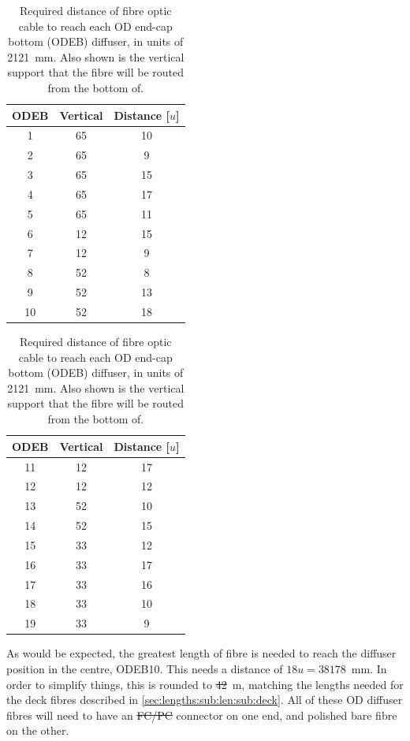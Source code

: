 \documentclass[a4paper,11pt]{article}
\providecommand{\DIFaddtex}[1]{{\protect\color{blue}\uwave{#1}}} %
\providecommand{\DIFdeltex}[1]{{\protect\color{red}\sout{#1}}}                      %
\providecommand{\DIFaddbegin}{} %
\providecommand{\DIFaddend}{} %
\providecommand{\DIFdelbegin}{} %
\providecommand{\DIFdelend}{} %
\providecommand{\DIFadd}[1]{\texorpdfstring{\DIFaddtex{#1}}{#1}} %
\providecommand{\DIFdel}[1]{\texorpdfstring{\DIFdeltex{#1}}{}} %
\newcommand{\DIFscaledelfig}{0.5}
\newlength{\DIFdelgraphicswidth} %
\newlength{\DIFdelgraphicsheight} %
\newcommand{\DIFaddincludegraphics}[2][]{{\color{blue}\fbox{\DIFOincludegraphics[#1]{#2}}}} %
\newcommand{\DIFdelincludegraphics}[2][]{%
\sbox{\DIFdelgraphicsbox}{\DIFOincludegraphics[#1]{#2}}%
\settoboxwidth{\DIFdelgraphicswidth}{\DIFdelgraphicsbox} %
\settoboxtotalheight{\DIFdelgraphicsheight}{\DIFdelgraphicsbox} %
\scalebox{\DIFscaledelfig}{%
\parbox[b]{\DIFdelgraphicswidth}{\usebox{\DIFdelgraphicsbox}\\[-\baselineskip] \rule{\DIFdelgraphicswidth}{0em}}\llap{\resizebox{\DIFdelgraphicswidth}{\DIFdelgraphicsheight}{%
\setlength{\unitlength}{\DIFdelgraphicswidth}%
\begin{picture}(1,1)%
\thicklines\linethickness{2pt} %
{\color[rgb]{1,0,0}\put(0,0){\framebox(1,1){}}}%
{\color[rgb]{1,0,0}\put(0,0){\line( 1,1){1}}}%
{\color[rgb]{1,0,0}\put(0,1){\line(1,-1){1}}}%
\end{picture}%
}\hspace*{3pt}}} %
} %
\DeclareRobustCommand{\DIFaddbegin}{\DIFOaddbegin \let\includegraphics\DIFaddincludegraphics} %
\DeclareRobustCommand{\DIFaddend}{\DIFOaddend \let\includegraphics\DIFOincludegraphics} %
\DeclareRobustCommand{\DIFdelbegin}{\DIFOdelbegin \let\includegraphics\DIFdelincludegraphics} %
\DeclareRobustCommand{\DIFdelend}{\DIFOaddend \let\includegraphics\DIFOincludegraphics} %
\begin{document}
\begin{table}[h!]
\centering
\begin{tabular}[t]{ccc}\toprule
ODEB	&	Vertical	&	Distance [$u$]	\\ \midrule
1		&		65		&	10		\\
2		&		65		&	9		\\
3		&		65		&	15		\\
4		&		65		&	17		\\
5		&		65		&	11		\\
6		&		12		&	15		\\
7		&		12		&	9		\\
8		&		52		&	8		\\
9		&		52		&	13		\\
10		&		52		&	18		\\	\bottomrule
\end{tabular}
\hspace{1cm}
\begin{tabular}[t]{ccc}\toprule
ODEB	&	Vertical	&	Distance [$u$]	\\ \midrule
11		&		12		&	17		\\
12		&		12		&	12		\\
13		&		52		&	10		\\
14		&		52		&	15		\\
15		&		33		&	12		\\
16		&		33		&	17		\\
17		&		33		&	16		\\
18		&		33		&	10		\\
19		&		33		&	9		\\	\bottomrule
\end{tabular}
\caption{Required distance of fibre optic cable to reach each OD end-cap bottom (ODEB) diffuser, in units of 2121~mm. Also shown is the vertical support that the fibre will be routed from the bottom of.}\label{tab:bottomEndCapLen}
\end{table}
As would be expected, the greatest length of fibre is needed to reach the diffuser position in the centre, ODEB10. This needs a distance of $18u = 38178$~mm. In order to simplify things, this is rounded to \DIFdelbegin \DIFdel{42}\DIFdelend \DIFaddbegin \DIFadd{44}\DIFaddend ~m, matching the lengths needed for the deck fibres described in \cref{sec:lengths:sub:len:sub:deck}. All of these OD diffuser fibres will need to have an \DIFdelbegin \DIFdel{FC/PC }\DIFdelend \DIFaddbegin \DIFadd{SMA }\DIFaddend connector on one end, and polished bare fibre on the other.
\end{document}
